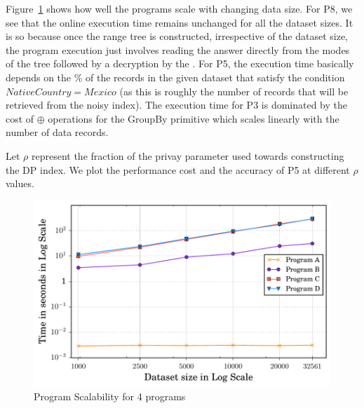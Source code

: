  Figure~\ref{fig:scale} shows how well the \system programs scale with changing data size. For P8, we see that the online execution time remains unchanged for all the dataset sizes. It is so because once the range tree is constructed, irrespective of the dataset size, the program execution just involves reading the answer directly from the modes of the tree followed by a decryption by the \CPS. For P5, the execution time basically depends on the \% of the records in the given dataset that satisfy the condition $NativeCountry=Mexico$ (as this is roughly the number of records that will be retrieved from the noisy index).  The execution time for P3 is dominated by the cost of $\oplus$ operations for the \textsf{GroupBy} primitive which scales linearly with the number of data records. 


   Let $\rho$ represent the fraction of the privay parameter used towards constructing the DP index. We plot the performance cost and the accuracy of P5 at different $\rho$ values.


\begin{figure}[b]
     \includegraphics[width=0.6\columnwidth]{scale_final.pdf}
        \caption{\system Program Scalability for 4 programs}\label{fig:scale}
\end{figure}

